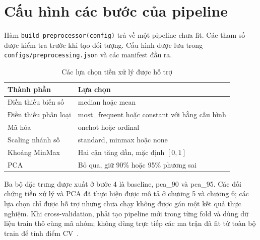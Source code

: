 \section{Cấu hình các bước của pipeline}
\label{sec:4_7}
Hàm \texttt{build\_preprocessor(config)} trả về một pipeline chưa fit. Các tham số được kiểm tra trước khi tạo đối tượng. Cấu hình được lưu trong \texttt{configs/preprocessing.json} và các manifest đầu ra.

\begin{table}[htbp]
\centering\small
\caption{Các lựa chọn tiền xử lý được hỗ trợ}\label{tab:preprocessing-options}
\begin{tabular}{p{}p{}}
\toprule
Thành phần & Lựa chọn \\
\midrule
Điền thiếu biến số & median hoặc mean \\
Điền thiếu phân loại & most\_frequent hoặc constant với hằng cấu hình \\
Mã hóa & onehot hoặc ordinal \\
Scaling nhánh số & standard, minmax hoặc none \\
Khoảng MinMax & Hai cận tăng dần, mặc định $[0,1]$ \\
PCA & Bỏ qua, giữ 90\% hoặc 95\% phương sai \\
\bottomrule
\end{tabular}
\end{table}

Ba bộ đặc trưng được xuất ở bước 4 là baseline, pca\_90 và pca\_95. Các đối chứng tiền xử lý và PCA đã thực hiện được mô tả ở chương 5 và chương 6; các lựa chọn chỉ được hỗ trợ nhưng chưa chạy không được gán một kết quả thực nghiệm. Khi cross-validation, phải tạo pipeline mới trong từng fold và dùng dữ liệu train thô cùng mã nhóm; không dùng trực tiếp các ma trận đã fit từ toàn bộ train để tính điểm CV~\cite{sklearn-pitfalls}.

